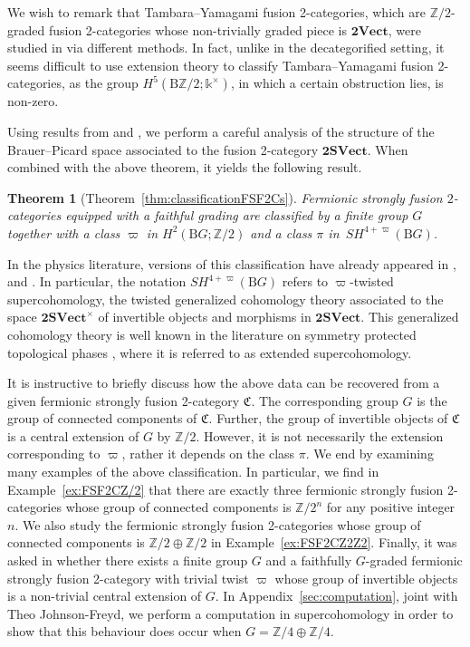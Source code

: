 \documentclass[10pt,a4paper]{amsart}
\newtheorem*{Theorem*}{Theorem}
\numberwithin{equation}{section}
\begin{document}
We wish to remark that Tambara--Yamagami fusion 2-categories, which are $\mathbb{Z}/2$-graded fusion 2-categories whose non-trivially graded piece is $\mathbf{2Vect}$, were studied in \cite{DY23} via different methods. In fact, unlike in the decategorified setting, it seems difficult to use extension theory to classify Tambara--Yamagami fusion 2-categories, as the group $H^5(\mathrm{B}\mathbb{Z}/2;\mathds{k}^{\times})$, in which a certain obstruction lies, is non-zero.

Using results from \cite{GJF0} and \cite{JFR}, we perform a careful analysis of the structure of the Brauer--Picard space associated to the fusion 2-category $\mathbf{2SVect}$. When combined with the above theorem, it yields the following result.

\begin{Theorem*}[Theorem~\ref{thm:classificationFSF2Cs}]
Fermionic strongly fusion $2$-categories equipped with a faithful grading are classified by a finite group $G$ together with a class $\varpi$ in $H^2(\mathrm{B}G;\mathbb{Z}/2)$ and a class $\pi$ in~$SH^{4+\varpi}(\mathrm{B}G)$.
\end{Theorem*}

In the physics literature, versions of this classification have already appeared in \cite{LW}, and \cite[Section~V.D]{JF}. In particular, the notation $SH^{4+\varpi}(\mathrm{B}G)$ refers to $\varpi$-twisted supercohomology, the twisted generalized cohomology theory associated to the space $\mathbf{2SVect}^{\times}$ of invertible objects and morphisms in $\mathbf{2SVect}$. This generalized cohomology theory is well known in the literature on symmetry protected topological phases \cite{GJF0,KT,WG}, where it is referred to as extended supercohomology.

It is instructive to briefly discuss how the above data can be recovered from a given fermionic strongly fusion 2-category $\mathfrak{C}$. The corresponding group $G$ is the group of connected components of $\mathfrak{C}$. Further, the group of invertible objects of $\mathfrak{C}$ is a central extension of $G$ by $\mathbb{Z}/2$. However, it is not necessarily the extension corresponding to $\varpi$, rather it depends on the class $\pi$. We end by examining many examples of the above classification. In particular, we find in Example~\ref{ex:FSF2CZ/2} that there are exactly three fermionic strongly fusion 2-categories whose group of connected components is $\mathbb{Z}/2^n$ for any positive integer $n$. We also study the fermionic strongly fusion 2-categories whose group of connected components is $\mathbb{Z}/2\oplus\mathbb{Z}/2$ in Example~\ref{ex:FSF2CZ2Z2}. Finally, it was asked in \cite{JFY} whether there exists a finite group $G$ and a faithfully $G$-graded fermionic strongly fusion 2-category with trivial twist $\varpi$ whose group of invertible objects is a non-trivial central extension of $G$. In Appendix~\ref{sec:computation}, joint with Theo Johnson-Freyd, we perform a computation in supercohomology in order to show that this behaviour does occur when $G=\mathbb{Z}/4\oplus \mathbb{Z}/4$.
\end{document}
